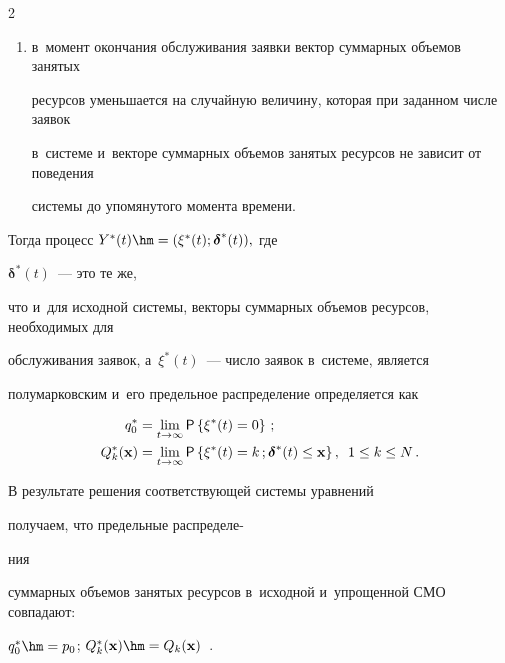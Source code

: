 \begin{multicols}{2}
\begin{enumerate}
\item[*] в~момент окончания обслуживания заявки вектор суммарных объемов занятых 


ресурсов уменьшается на случайную величину, которая при заданном числе заявок 


в~сис\-те\-ме и~векторе суммарных объемов занятых ресурсов не зависит от поведения 


сис\-те\-мы до упомянутого момента времени.


\end{enumerate}





Тогда процесс $Y^*(t)\hm=(\xi^*(t);\boldsymbol{\delta}^*(t)),$ где 


$\boldsymbol{\delta}^*(t)$~--- это те же,


что и~для исходной сис\-те\-мы, векторы суммарных объемов ресурсов, необходимых для


обслуживания заявок, а~$\xi^*(t)$~--- число заявок в~сис\-те\-ме, является 


полумарковским и~его предельное распределение определяется как


\begin{align*}


q_0^*&=\lim\limits_{t\rightarrow \infty}{\sf P}\left\{\xi^*(t)=0\right\}\,;


\\


Q_k^*(\mathbf{x})&=\lim\limits_{t\rightarrow \infty}{\sf P}\left\{\xi^*(t)=k\,; 


\boldsymbol{\delta}^*(t) \leq \mathbf{x}\right\}, \enskip 1\leq k\leq N\,.


\end{align*}


В результате решения соответствующей сис\-те\-мы урав\-не\-ний 


получаем, что предельные распределе-\linebreak\vspace*{-12pt}





\pagebreak





\noindent


ния 


суммарных объемов занятых ресурсов в~исходной и~упрощенной СМО совпадают: 


$q_0^*\hm=p_0$; $Q_k^*(\mathbf{x})\hm=Q_k(\mathbf{x})$~\cite{Naumov_3_2016}.






\end{multicols}
